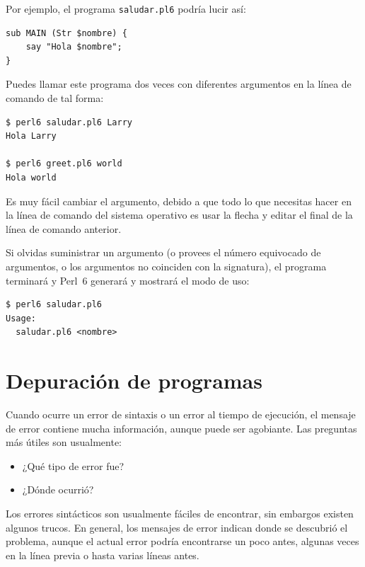 Por ejemplo, el programa {\tt saludar.pl6} podría lucir
así:
\begin{verbatim}
sub MAIN (Str $nombre) {
    say "Hola $nombre";
}
\end{verbatim}

Puedes llamar este programa dos veces con diferentes argumentos
en la línea de comando de tal forma:

\begin{verbatim}
$ perl6 saludar.pl6 Larry
Hola Larry

$ perl6 greet.pl6 world
Hola world
\end{verbatim}

Es muy fácil cambiar el argumento, debido a que todo lo que
necesitas hacer en la línea de comando del sistema operativo
es usar la flecha y editar el final de la línea de comando
anterior.

Si olvidas suministrar un argumento (o provees el número 
equivocado de argumentos, o los argumentos no coinciden con
la signatura), el programa terminará y Perl~6 generará
y mostrará el modo de uso:

\begin{verbatim}
$ perl6 saludar.pl6
Usage:
  saludar.pl6 <nombre>
\end{verbatim}


\section{Depuración de programas}
\label{whitespace}

Cuando ocurre un error de sintaxis o un error al tiempo de ejecución,
el mensaje de error contiene mucha información, aunque puede ser
agobiante. Las preguntas más útiles son usualmente:

\begin{itemize}

\item ¿Qué tipo de error fue?

\item ¿Dónde ocurrió?

\end{itemize}

Los errores sintácticos son usualmente fáciles de encontrar,
sin embargos existen algunos trucos. En general, los mensajes 
de error indican donde se descubrió el problema, aunque el actual
error podría encontrarse un poco antes, algunas veces en la 
línea previa o hasta varias líneas antes.

